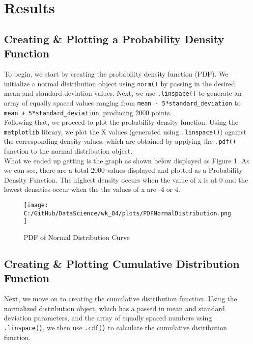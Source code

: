 \documentclass[a4paper,twocolumn]{article}
\begin{document}
\section{Results}

\subsection{Creating \& Plotting a Probability Density Function}
To begin, we start by creating the probability density function (PDF). We initialize a normal distribution object
 using \texttt{norm()} by passing in the desired mean and standard deviation values. Next, we use \texttt{.linspace()} 
 to generate an array of equally spaced values ranging from \texttt{mean - 5*standard\_deviation} to 
 \texttt{mean + 5*standard\_deviation}, producing 2000 points. \\

Following that, we proceed to plot the probability density function. Using the \texttt{matplotlib} library, we plot 
the X values (generated using \texttt{.linspace()}) against the corresponding density values, which are obtained by
applying the \texttt{.pdf()} function to the normal distribution object. \\

What we ended up getting is the graph as shown below displayed as Figure 1. As we can see, there are a total 2000 
values displayed and plotted as a Probability Density Function. The highest density occurs when the value of x is at 
0 and the lowest densities occur when the the values of x are -4 or 4.

\begin{figure}[htbp] 
    \centering
    \noindent
    \texttt{[image: C:/GitHub/DataScience/wk\_04/plots/PDFNormalDistribution.png]}
    \caption{PDF of Normal Distribution Curve} 
\end{figure}

\newpage

\subsection{Creating \& Plotting  Cumulative Distribution Function}
Next, we move on to creating the cumulative distribution function. Using the normalized distribution object, which 
has a passed in mean and standard deviation parameters, and the array of equally spaced numbers using
\texttt{.linspace()}, we then use \texttt{.cdf()} to calculate the cumulative distribution function. \\
\end{document}

